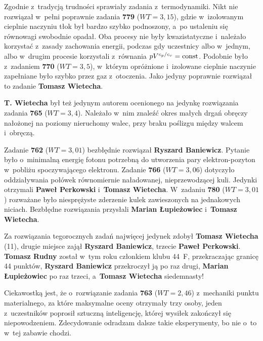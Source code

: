 {\vspace*{\parskip}
  \begin{dwieszpalty}
Zgodnie z~tradycją trudności sprawiały zadania z~termodynamiki. Nikt nie rozwiązał w~pełni poprawnie zadania {\bf 779} ($WT = 3{,}15$), gdzie w~izolowanym cieplnie naczyniu tłok był bardzo szybko podnoszony, a~po ustaleniu się równowagi swobodnie opadał. Oba procesy nie były kwazistatyczne i~należało korzystać z~zasady zachowania energii, podczas gdy uczestnicy albo w~jednym, albo w~drugim procesie korzystali z~równania $pV^{c_{p}/c_{v}}=\textup{const}$. Podobnie było z~zadaniem {\bf770} ($WT = 3{,}5$), w~którym opróżnione i~izolowane cieplnie naczynie zapełniane było szybko przez gaz z~otoczenia. Jako jedyny poprawnie rozwiązał to zadanie {\bf Tomasz Wietecha}.

{\bf T. Wietecha} był też jedynym autorem ocenionego na jedynkę rozwiązania zadania {\bf765} ($WT = 3{,}4$). Należało w~nim znaleźć okres małych drgań obręczy nałożonej na poziomy nieruchomy walec, przy braku poślizgu między walcem i~obręczą.

Zadanie {\bf 762} ($WT = 3{,}01$) bezbłędnie rozwiązał {\bf Ryszard Baniewicz}. Pytanie było o~minimalną energię fotonu potrzebną do utworzenia pary elektron-pozyton w~pobliżu spoczywającego elektronu. Zadanie {\bf766} ($WT = 3{,}06$) dotyczyło oddziaływania połówek równomiernie naładowanej, nieprzewodzącej kuli. Jedynki otrzymali {\bf Paweł Perkowski} i~{\bf Tomasz Wietecha}. W~zadaniu {\bf780} ($WT = 3{,}01$) rozważane było niesprężyste zderzenie kulek zawieszonych na jednakowych niciach. Bezbłędne rozwiązania przysłali {\bf Marian Łupieżowiec} i~{\bf Tomasz Wietecha}.

Za rozwiązania tegorocznych zadań najwięcej jedynek zdobył {\bf Tomasz Wietecha} (11), drugie miejsce zajął {\bf Ryszard Baniewicz}, trzecie {\bf Paweł Perkowski}.
{\bf Tomasz Rudny} został w~tym roku członkiem klubu 44~F, przekraczając granicę 44 punktów, {\bf Ryszard Baniewicz} przekroczył ją po raz drugi, {\bf Marian Łupieżowiec} po raz trzeci, a~{\bf Tomasz Wietecha} siedemnasty!

Ciekawostką jest, że o~rozwiązanie zadania {\bf763} ($WT =2{,}46$) z~mechaniki punktu materialnego, za które maksymalne oceny otrzymały trzy osoby, jeden z~uczestników poprosił sztuczną inteligencję, której wysiłek zakończył się niepowodzeniem. Zdecydowanie odradzam dalsze takie eksperymenty, bo nie o~to w~tej zabawie chodzi.
\end{dwieszpalty}


}

